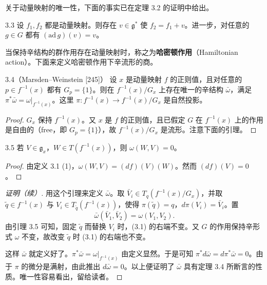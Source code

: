 
关于动量映射的唯一性，下面的事实已在定理 3.2 的证明中给出。

\begin{proposition}{3.3}
  设 $f_1,f_2$ 都是动量映射。则存在 $v\in\mathfrak{g}^*$ 使 $f_2=f_1+v$。进一步，对任意的 $g\in G$ 都有 $(\mathrm{ad}\,g)(v)=v$。
\end{proposition}

当保持辛结构的群作用存在动量映射时，称之为\textbf{哈密顿作用}（Hamiltonian action）。下面来定义哈密顿作用下辛流形的商。

\begin{theorem*}{3.4（Marsden–Weinstein [245]）}
  设 $x$ 是动量映射 $f$ 的正则值，且对任意的 $p\in f^{-1}(x)$ 都有 $G_p=\{1\}$。则在 $f^{-1}(x)/G_x$ 上存在唯一的辛结构 $\bar\omega$，满足 $\pi^*\bar\omega=\omega|_{f^{-1}(x)}$。这里 $\pi\colon f^{-1}(x)\to f^{-1}(x)/G_x$ 是自然投影。
\end{theorem*}

\begin{proof}
  $G_x$ 保持 $f^{-1}(x)$。又 $x$ 是 $f$ 的正则值，且已假定 $G$ 在 $f^{-1}(x)$ 上的作用是自由的（free，即 $G_p=\{1\}$），故 $f^{-1}(x)/G_x$ 是流形。注意下面的引理。
\end{proof}

\begin{lemma*}{3.5}
  若 $V\in\mathfrak{g}_x$，$W\in T(f^{-1}(x))$，则 $\omega(W,V)=0$。
\end{lemma*}

\begin{proof}
  由定义 3.1 (1)，$\omega(W,V)=(df)(V)(W)$。然而 $(df)(V)=0$。
\end{proof}

\begin{proof}[证明（续）]
用这个引理来定义 $\bar\omega$。取 $\bar V_i\in T_q(f^{-1}(x)/G_x)$，并取 $\tilde q\in f^{-1}(x)$ 与 $V_i\in T_{\tilde q}(f^{-1}(x))$，使得 $\pi(\tilde q)=q$，$d\pi(V_i)=\bar V_i$。置
\begin{equation}
  \bar\omega(\bar V_1,\bar V_2)=\omega(V_1,V_2). \tag{3.1}
\end{equation}
由引理 3.5 可知，固定 $\tilde q$ 而替换 $V_i$ 时，(3.1) 的右端不变。又 $G$ 的作用保持辛形式 $\omega$ 不变，故改变 $\tilde q$ 时 (3.1) 的右端也不变。

这样 $\bar\omega$ 就定义好了。$\pi^*\bar\omega=\omega|_{f^{-1}(x)}$ 由定义显然。于是可知 $\pi^*d\bar\omega=d\pi^*\bar\omega=0$。由于 $\pi$ 的微分是满射，由此推出 $d\bar\omega=0$。以上便证明了 $\bar\omega$ 具有定理 3.4 所断言的性质。唯一性容易看出，留给读者。
\end{proof}

